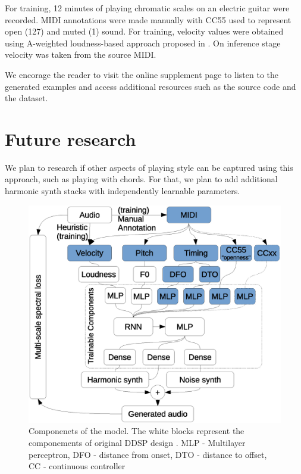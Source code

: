 \documentclass{article}
\begin{document}
\begin{sloppy}
For training, 12 minutes of playing chromatic scales on an electric guitar  were recorded. MIDI annotations were made manually with CC55 used to represent open (127) and muted (1) sound. For training, velocity values were obtained using A-weighted loudness-based approach proposed in \cite{control-synthesis}. On inference stage velocity was taken from the source MIDI.

We encorage the reader to visit the online supplement page \cite{online_supplement} to listen to the generated examples and access additional resources such as the source code and the dataset.

\section{Future research}
\label{sec:future_research}


We plan to research if other aspects of playing style can be captured using this approach, such as playing with chords. For that, we plan to add additional harmonic synth stacks with independently learnable parameters.

\begin{figure}[t]
  \centering
  \centerline{\includegraphics[scale=0.4]{components}}
  \caption{Componenets of the model. The white blocks represent the componements of original DDSP design \cite{ddsp}. 
MLP - Multilayer perceptron, 
DFO - distance from onset, 
DTO - distance to offset,
CC - continuous controller
}
  \label{fig:components}
\end{figure}


\end{sloppy}
\end{document}
